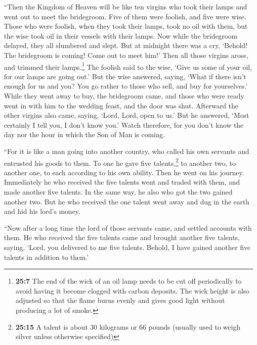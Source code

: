  ``Then the Kingdom of Heaven will be like ten virgins who
took their lamps and went out to meet the bridegroom. 
Five of them were foolish, and five were wise.  Those who
were foolish, when they took their lamps, took no oil with them,
 but the wise took oil in their vessels with their lamps.
 Now while the bridegroom delayed, they all slumbered and
slept.  But at midnight there was a cry, `Behold! The
bridegroom is coming! Come out to meet him!'  Then all
those virgins arose, and trimmed their lamps.\footnote{\textbf{25:7} The
  end of the wick of an oil lamp needs to be cut off periodically to
  avoid having it become clogged with carbon deposits. The wick height
  is also adjusted so that the flame burns evenly and gives good light
  without producing a lot of smoke.}  The foolish said to
the wise, `Give us some of your oil, for our lamps are going out.'
 But the wise answered, saying, `What if there isn't
enough for us and you? You go rather to those who sell, and buy for
yourselves.'  While they went away to buy, the bridegroom
came, and those who were ready went in with him to the wedding feast,
and the door was shut.  Afterward the other virgins also
came, saying, `Lord, Lord, open to us.'  But he answered,
`Most certainly I tell you, I don't know you.'  Watch
therefore, for you don't know the day nor the hour in which the Son of
Man is coming.

 ``For it is like a man going into another country, who
called his own servants and entrusted his goods to them. 
To one he gave five talents,\footnote{\textbf{25:15} A talent is about
  30 kilograms or 66 pounds (usually used to weigh silver unless
  otherwise specified)} to another two, to another one, to each
according to his own ability. Then he went on his journey.
 Immediately he who received the five talents went and
traded with them, and made another five talents.  In the
same way, he also who got the two gained another two. 
But he who received the one talent went away and dug in the earth and
hid his lord's money.

 ``Now after a long time the lord of those servants came,
and settled accounts with them.  He who received the five
talents came and brought another five talents, saying, `Lord, you
delivered to me five talents. Behold, I have gained another five talents
in addition to them.'

